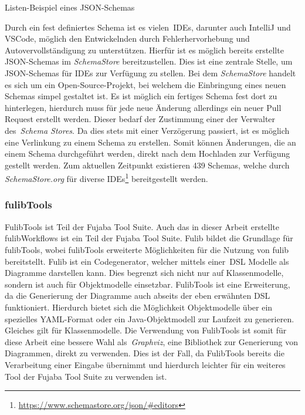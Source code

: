 \begin{listing}[!ht]
    \inputminted{json}{listings/2.2.1/list.schema.json}
    \caption{Listen-Beispiel eines JSON-Schemas}
    \label{listing:listSchema}
\end{listing}

Durch ein fest definiertes Schema ist es vielen~\acp{IDE}, darunter auch IntelliJ und VSCode,
möglich den Entwickelnden durch Fehlerhervorhebung und Autovervollständigung zu unterstützen.
Hierfür ist es möglich bereits erstellte JSON-Schemas im \textit{SchemaStore} bereitzustellen.
Dies ist eine zentrale Stelle, um JSON-Schemas für \acp{IDE} zur Verfügung zu stellen.
Bei dem \textit{SchemaStore} handelt es sich um ein Open-Source-Projekt, bei welchem die Einbringung eines neuen Schemas simpel gestaltet ist.
Es ist möglich ein fertiges Schema fest dort zu hinterlegen, hierdurch muss für jede neue Änderung allerdings ein neuer Pull Request erstellt werden.
Dieser bedarf der Zustimmung einer der Verwalter des~\textit{Schema Stores}.
Da dies stets mit einer Verzögerung passiert, ist es möglich eine Verlinkung zu einem Schema zu erstellen.
Somit können Änderungen, die an einem Schema durchgeführt werden, direkt nach dem Hochladen zur Verfügung gestellt werden.
Zum aktuellen Zeitpunkt existieren 439 Schemas, welche durch \textit{SchemaStore.org} für diverse \acp{IDE}\footnote{\url{https://www.schemastore.org/json/#editors}}
bereitgestellt werden\cite*{schemaStore}.

\subsubsection{fulibTools}

FulibTools ist Teil der Fujaba Tool Suite.
Auch das in dieser Arbeit erstellte fulibWorkflows ist ein Teil der Fujaba Tool Suite.
Fulib bildet die Grundlage für fulibTools, wobei fulibTools erweiterte Möglichkeiten für die Nutzung von fulib bereitstellt.
Fulib ist ein Codegenerator, welcher mittels einer~\ac{DSL} Modelle als Diagramme darstellen kann\cite*{fulib}.
Dies begrenzt sich nicht nur auf Klassenmodelle, sondern ist auch für Objektmodelle einsetzbar.
FulibTools ist eine Erweiterung, da die Generierung der Diagramme auch abseits der eben erwähnten DSL funktioniert\cite*{fulibTools}.
Hierdurch bietet sich die Möglichkeit Objektmodelle über ein spezielles YAML-Format oder ein Java-Objektmodell zur Laufzeit zu generieren.
Gleiches gilt für Klassenmodelle.
Die Verwendung von FulibTools ist somit für diese Arbeit eine bessere Wahl als~\textit{Graphviz}, eine Bibliothek zur Generierung von Diagrammen, direkt zu verwenden.
Dies ist der Fall, da FulibTools bereits die Verarbeitung einer Eingabe übernimmt und hierdurch leichter für ein weiteres Tool der Fujaba Tool Suite zu verwenden ist.
